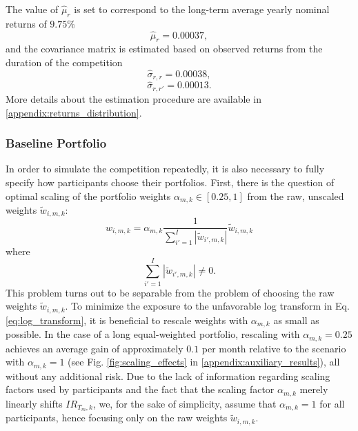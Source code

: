 \documentclass[3p,times,twocolumn]{elsarticle}
\begin{document}
The value of $\widehat{\mu}_{r}$ is set to correspond to the long-term average yearly nominal returns of $9.75\%$ \citep{webster500Returns19302023}
\begin{equation}
    \widehat{\mu}_{r}=0.00037,
\end{equation}
and the covariance matrix is estimated based on observed returns from the duration of the competition
\begin{equation}
    \widehat{\sigma}_{r,r}=0.00038,
\end{equation}
\begin{equation}
    \widehat{\sigma}_{r,r'}=0.00013.
\end{equation}
More details about the estimation procedure are available in \ref{appendix:returns_distribution}.

\subsubsection{Baseline Portfolio}

In order to simulate the competition repeatedly, it is also necessary to fully specify how participants choose their portfolios.
First, there is the question of optimal scaling of the portfolio weights $\alpha_{m,k} \in [0.25, 1]$ from the raw, unscaled weights $\tilde{w}_{i,m,k}$:
\begin{equation}
    w_{i,m,k}=\alpha_{m,k} \frac{1}{\sum_{i'=1}^{I}|\tilde{w}_{i',m,k}|}\tilde{w}_{i,m,k}
\end{equation}
where
\begin{equation}
    \sum_{i'=1}^{I}|\tilde{w}_{i',m,k}| \neq 0.
\end{equation}
This problem turns out to be separable from the problem of choosing the raw weights $\tilde{w}_{i,m,k}$. To minimize the exposure to the unfavorable log transform in Eq. \ref{eq:log_transform}, it is beneficial to rescale weights with $\alpha_{m,k}$ as small as possible.
In the case of a long equal-weighted portfolio, rescaling with $\alpha_{m,k}=0.25$ achieves an average gain of approximately $0.1$ per month relative to the scenario with $\alpha_{m,k}=1$ (see Fig. \ref{fig:scaling_effects} in \ref{appendix:auxiliary_results}), all without any additional risk.
Due to the lack of information regarding scaling factors used by participants and the fact that the scaling factor $\alpha_{m,k}$ merely linearly shifts $IR_{T_{m},k}$, we, for the sake of simplicity, assume that $\alpha_{m,k}=1$ for all participants, hence focusing only on the raw weights $\tilde{w}_{i,m,k}$.
\end{document}
